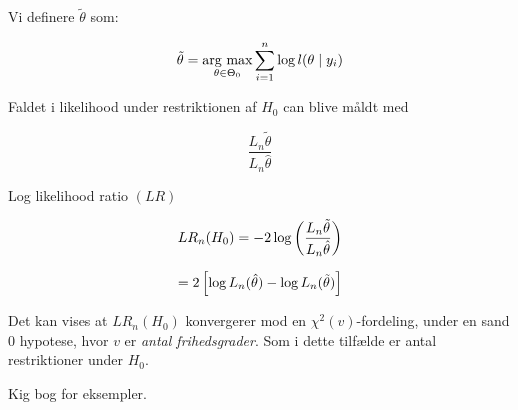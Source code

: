 Vi definere $\tilde{\theta}$ som:

\begin{equation}
    \tilde{\theta} = \underset{\theta \in \Theta_0}{\text{arg max}} \sum_{i=1}^{n} \log l(\theta \mid y_i)
\end{equation}

Faldet i likelihood under restriktionen af $H_0$ can blive måldt med

\begin{equation}
    \frac{L_n \tilde{\theta}}{L_n \hat{\theta}}
\end{equation}

Log likelihood ratio $(LR)$

\begin{equation}
    LR_n (H_0) = -2 \log \left( \frac{ L_n \tilde{\theta}}{ L_n \hat{\theta}} \right)
\end{equation}

\begin{equation}
    = 2 \left[ \log L_n (\hat{\theta}) - \log L_n (\tilde{\theta}) \right]
\end{equation}

Det kan vises at $ LR_n (H_0)$ konvergerer mod en $\chi^2(v)$-fordeling, under en sand 0 hypotese, hvor $v$ er \textit{antal frihedsgrader}. Som i dette tilfælde er antal restriktioner under $H_0$.

Kig bog for eksempler.
